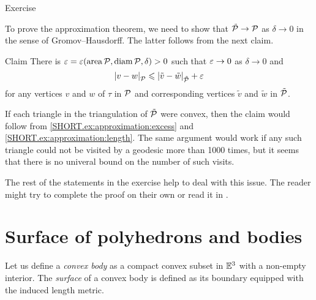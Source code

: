 \begin{thm}{Exercise}

\end{thm}

To prove the approximation theorem, we need to show that $\tilde {\mathcal{P}}\to \mathcal{P}$ as $\delta\to0$ in the sense of Gromov--Hausdorff.
The latter follows from the next claim.

\begin{thm}{Claim}
There is $\varepsilon=\varepsilon(\operatorname{\rm area}\nolimits\mathcal{P}, \operatorname{\rm diam}\nolimits\mathcal{P}, \delta)>0$ such that $\varepsilon\to0$ as $\delta\to 0$ and
\[|{v}-{w}|_{\mathcal{P}}^{{}}\leqslant |{\tilde v}-{\tilde w}|_{\tilde{\mathcal{P}}}^{{}}+\varepsilon\]
for any vertices $v$ and $w$ of $\tau$ in $\mathcal{P}$ and corresponding vertices $\tilde v$ and $\tilde w$ in $\tilde{\mathcal{P}}$.
\end{thm}

If each triangle in the triangulation of $\tilde{\mathcal{P}}$ were convex, then the claim would follow from \ref{SHORT.ex:approximation:excess} and \ref{SHORT.ex:approximation:length}.
The same argument would work if any such triangle could not be visited by a geodesic more than 1000 times,
but it seems that there is no univeral bound on the number of such visits.

The rest of the statements in the exercise help to deal with this issue.
The reader might try to complete the proof on their own or read it in \cite[VII § 6]{alexandrov-1948}.

\section{Surface of polyhedrons and bodies}

Let us define a \emph{convex body} as a compact convex subset in $\mathbb{E}^3$ with a non-empty interior.
The \emph{surface} of a convex body is defined as its boundary equipped with the induced length metric.

